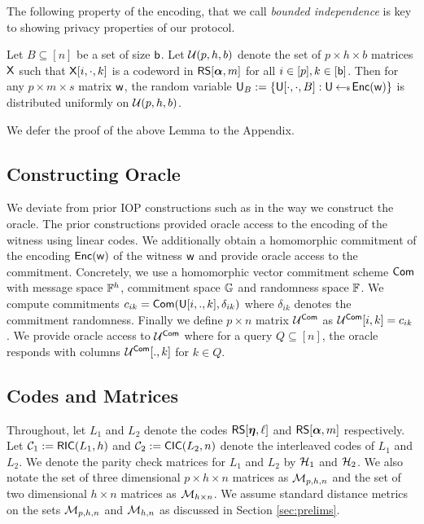 The following property of the encoding, that we call {\em bounded independence}
is key to showing privacy properties of our protocol.
\begin{lemma}\label{lem:boundedindependence}
Let $B\subseteq [n]$ be a set of size $\mathsf{b}$. Let $\mathcal{U}(p,h,b)$ denote the
set of $p\times h\times b$ matrices $\mathsf{X}$ such
that $\mathsf{X}[i,\cdot,k]$ is a codeword in $\mathsf{RS}[\bm{\alpha},m]$ for all $i\in
[p],k\in [\mathsf{b}]$. Then for any $p\times m\times s$ matrix $\mathsf{w}$, the random
variable $\mathsf{U}_B := \{\mathsf{U}[\cdot,\cdot,B]: \mathsf{U}\hskip2.3pt{\gets\!\!\mbox{\tiny${\$}$\normalsize}}\, \mathsf{Enc}(\mathsf{w})\}$ is
distributed uniformly on $\mathcal{U}(p,h,b)$.
\end{lemma}
We defer the proof of the above Lemma to the Appendix.

\subsection{Constructing Oracle}\label{sec:construct_oracle} 
We deviate from prior IOP constructions
such as \cite{ligero, aurora} in the way we construct the oracle. The prior
constructions provided oracle access to the encoding of the witness using linear
codes. We
additionally obtain a homomorphic commitment of the encoding $\mathsf{Enc}(\mathsf{w})$ of the
witness $\mathsf{w}$ and provide oracle access to the commitment. Concretely, we use a
homomorphic vector commitment scheme $\mathsf{Com}$ with message space $\mathbb{F}^h$,
commitment space $\mathbb{G}$ and randomness space $\mathbb{F}$. We compute commitments
$c_{ik}=\mathsf{Com}(\mathsf{U}[i,.,k],\delta_{ik})$ where $\delta_{ik}$ denotes the
commitment randomness. Finally we define $p\times n$ matrix $\mathcal{U}^{\mathsf{Com}}$ as
$\mathcal{U}^{\mathsf{Com}}[i,k]=c_{ik}$. We provide oracle access to $\mathcal{U}^{\mathsf{Com}}$ where for a
query $Q\subseteq [n]$, the oracle responds with columns $\mathcal{U}^{\mathsf{Com}}[.,k]$ for
$k\in Q$.

\subsection{Codes and Matrices}\label{sec:codesandmatrices}
Throughout, let $L_1$ and $L_2$ denote the codes $\mathsf{RS}[\bm{\eta},\ell]$ and
$\mathsf{RS}[\bm{\alpha},m]$ respectively. Let $\mathcal{C}_1 := \mathsf{RIC}(L_1,h)$ and $\mathcal{C}_2 :=
\mathsf{CIC}(L_2,n)$ denote the interleaved codes of $L_1$ and $L_2$. We denote the
parity check matrices for $L_1$ and $L_2$ by $\mathcal{H}_1$ and $\mathcal{H}_2$. We also
notate the set of three dimensional $p\times h\times n$ matrices as $\mathcal{M}_{p,h,n}$ and
the set of two dimensional $h\times n$ matrices as $\mathcal{M}_{h\times n}$. We
assume standard distance metrics on the sets $\mathcal{M}_{p,h,n}$ and $\mathcal{M}_{h,n}$
as discussed in Section \ref{sec:prelims}. 

